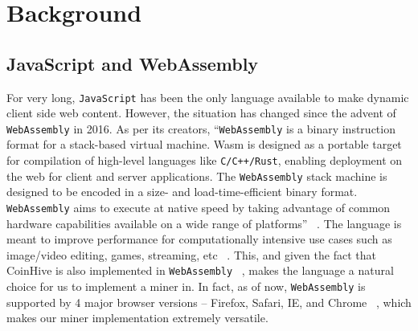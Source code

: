 \documentclass[runningheads]{llncs}
\newcommand{\trishita}[1]{{\color{magenta}\bfseries[Trishita: #1]}}
\begin{document}
\section{Background}
\label{sec:background}
\subsection{JavaScript and WebAssembly}
For very long, \verb|JavaScript| has been the only language available to make dynamic client side web content. However, the situation has changed since the advent of \verb|WebAssembly| in 2016. As per its creators, ``\verb|WebAssembly| is a binary instruction format for a stack-based virtual machine. Wasm is designed as a portable target for compilation of high-level languages like \verb|C/C++/Rust|, enabling deployment on the web for client and server applications. The \verb|WebAssembly| stack machine is designed to be encoded in a size- and load-time-efficient binary format. \verb|WebAssembly| aims to execute at native speed by taking advantage of common hardware capabilities available on a wide range of platforms'' ~\cite{webAssembly}. The language is meant to improve performance for computationally intensive use cases such as image/video editing, games, streaming, etc ~\cite{webAssembly}. This, and given the fact that CoinHive is also implemented in \verb|WebAssembly| ~\cite{coinhive}, makes the language a natural choice for us to implement a miner in. In fact, as of now, \verb|WebAssembly| is supported by 4 major browser versions -- Firefox, Safari, IE, and Chrome ~\cite{webAssembly}, which makes our miner implementation extremely versatile.


\end{document}
